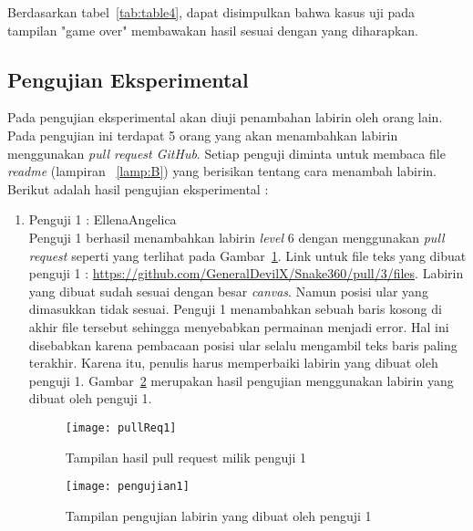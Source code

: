 \begin{enumerate}
	Berdasarkan tabel~\ref{tab:table4}, dapat disimpulkan bahwa kasus uji pada tampilan "game over" membawakan hasil sesuai dengan yang diharapkan. 
\end{enumerate}

\subsection{Pengujian Eksperimental}
Pada pengujian eksperimental akan diuji penambahan labirin oleh orang lain. Pada pengujian ini terdapat 5 orang yang akan menambahkan labirin menggunakan \textit{pull request GitHub}. Setiap penguji diminta untuk membaca file \textit{readme} (lampiran ~\ref{lamp:B}) yang berisikan tentang cara menambah labirin. Berikut adalah hasil pengujian eksperimental : 

\begin{enumerate}
	\item Penguji 1 : EllenaAngelica\\
	Penguji 1 berhasil menambahkan labirin \textit{level} 6 dengan menggunakan \textit{pull request} seperti yang terlihat pada Gambar~\ref{fig:pullReq1}. Link untuk file teks yang dibuat penguji 1 :  \url{https://github.com/GeneralDevilX/Snake360/pull/3/files}. Labirin yang dibuat sudah sesuai dengan besar \textit{canvas}. Namun posisi ular yang dimasukkan tidak sesuai. Penguji 1 menambahkan sebuah baris kosong di akhir file tersebut sehingga menyebabkan permainan menjadi error. Hal ini disebabkan karena pembacaan posisi ular selalu mengambil teks baris paling terakhir. Karena itu, penulis harus memperbaiki labirin yang dibuat oleh penguji 1. Gambar~\ref{fig:pengujian1} merupakan hasil pengujian menggunakan labirin yang dibuat oleh penguji 1. 
	
	\begin{figure}[H]
		\centering  
		\texttt{[image: pullReq1]}  
		\caption[Tampilan hasil pull request milik penguji 1]{Tampilan hasil pull request milik penguji 1}
		\label{fig:pullReq1} 
	\end{figure}
	
	\begin{figure}[H]
		\centering  
		\texttt{[image: pengujian1]}  
		\caption[Tampilan pengujian labirin yang dibuat oleh penguji 1]{Tampilan pengujian labirin yang dibuat oleh penguji 1}
		\label{fig:pengujian1} 
	\end{figure}	
	

\end{enumerate}
